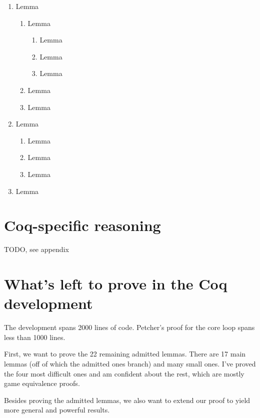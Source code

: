 \documentclass[12pt,lot, lof]{puthesis}
\begin{document}
{\begin{enumerate}
\item Lemma
  \begin{enumerate}
  \item Lemma 
    \begin{enumerate}
    \item Lemma 
    \item Lemma 
    \item Lemma 
    \end{enumerate} 
  \item Lemma 
  \item Lemma 
  \end{enumerate} 
\item Lemma 
  \begin{enumerate}
  \item Lemma 
  \item Lemma 
  \item Lemma 
  \end{enumerate} 
\item Lemma 
\end{enumerate}

\section{Coq-specific reasoning}

TODO, see appendix

\section{What's left to prove in the Coq development}

The development spans 2000 lines of code. Petcher's proof for the core loop spans less than 1000 lines.

First, we want to prove the 22 remaining admitted lemmas. There are 17 main lemmas (off of which the admitted ones branch) and many small ones. I've proved the four most difficult ones and am confident about the rest, which are mostly game equivalence proofs. 

Besides proving the admitted lemmas, we also want to extend our proof to yield more general and powerful results.

}
\end{document}
